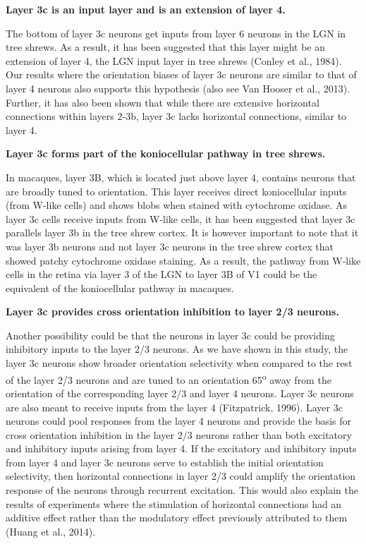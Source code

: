 \textbf{Layer 3c is an input layer and is an extension of layer 4.}

The bottom of layer 3c neurons get inputs from layer 6 neurons in the
LGN in tree shrews. As a result, it has been suggested that this layer
might be an extension of layer 4, the LGN input layer in tree shrews
(Conley et al., 1984). Our results where the orientation biases of layer
3c neurons are similar to that of layer 4 neurons also supports this
hypothesis (also see Van Hooser et al., 2013). Further, it has also been
shown that while there are extensive horizontal connections within
layers 2-3b, layer 3c lacks horizontal connections, similar to layer 4.

\textbf{Layer 3c forms part of the koniocellular pathway in tree shrews.}

In macaques, layer 3B, which is located just above layer 4, contains
neurons that are broadly tuned to orientation. This layer receives
direct koniocellular inputs (from W-like cells) and shows blobs when
stained with cytochrome oxidase. As layer 3c cells receive inputs from
W-like cells, it has been suggested that layer 3c parallels layer 3b in
the tree shrew cortex. It is however important to note that it was layer
3b neurons and not layer 3c neurons in the tree shrew cortex that showed
patchy cytochrome oxidase staining. As a result, the pathway from W-like
cells in the retina via layer 3 of the LGN to layer 3B of V1 could be
the equivalent of the koniocellular pathway in macaques.

\textbf{Layer 3c provides cross orientation inhibition to layer 2/3 neurons.}

Another possibility could be that the neurons in layer 3c could be
providing inhibitory inputs to the layer 2/3 neurons. As we have shown
in this study, the layer 3c neurons show broader orientation selectivity
when compared to the rest of the layer 2/3 neurons and are tuned to an
orientation 65\textsuperscript{o} away from the orientation of the
corresponding layer 2/3 and layer 4 neurons. Layer 3c neurons are also
meant to receive inputs from the layer 4 (Fitzpatrick, 1996). Layer 3c
neurons could pool responses from the layer 4 neurons and provide the
basis for cross orientation inhibition in the layer 2/3 neurons rather
than both excitatory and inhibitory inputs arising from layer 4. If the
excitatory and inhibitory inputs from layer 4 and layer 3c neurons serve
to establish the initial orientation selectivity, then horizontal
connections in layer 2/3 could amplify the orientation response of the
neurons through recurrent excitation. This would also explain the
results of experiments where the stimulation of horizontal connections
had an additive effect rather than the modulatory effect previously
attributed to them (Huang et al., 2014).


